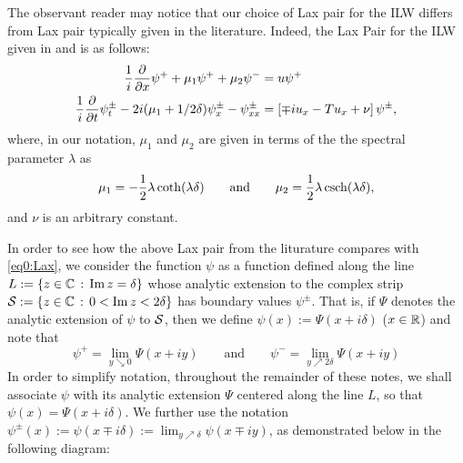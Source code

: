 \documentclass[../dissertation.tex]{subfiles}
\begin{document}
The observant reader may notice that our choice of Lax pair for the ILW differs 
from Lax pair typically given in the literature. Indeed, the Lax Pair for the ILW
given in \cite{SATSUMA1979} and \cite{Kodama1982} is as follows:
\begin{subequations}
	\label{eq:ILW.lax}
	\begin{align}
		\label{eq:ILW.lax.x} 
		\frac{1}{i} \frac{\partial}{\partial x} \psi^+ + \mu_1\psi^+ + \mu_2\psi^- &= u \psi^+  \\
		\label{eq:ILW.lax.t}
		\frac{1}{i} \frac{\partial}{\partial t} \psi_t^\pm - 2i (\mu_1 + 1/2\delta) \psi_x^\pm - \psi_{xx}^\pm 
			&= \left[ \mp i u_x - T u_x + \nu \right]\psi^\pm,
	\end{align}
\end{subequations}
where, in our notation, $\mu_1$ and $\mu_2$ are given in terms of the 
the spectral parameter $\lambda$ as
\begin{align*} \label{LambdaAndMu}
	\mu_1 = - \frac{1}{2} \lambda \coth(\lambda \delta) \qquad \text{and} \qquad
	\mu_2 = \frac{1}{2}\lambda \operatorname{csch}(\lambda \delta),
\end{align*}
and $\nu$ is an arbitrary constant.

In order to see how the above Lax pair from the liturature compares with 
\eqref{eq0:Lax},
we consider the function $\psi$ 
as a function defined along the line $L:= \{z \in \mathbb{C} \,:\, \operatorname{Im} z = \delta\}$ 
whose analytic extension to the complex strip 
$\mathcal S := \{ z \in \mathbb{C} \,:\,  0 < \operatorname{Im} z < 2 \delta\}$
has boundary values $\psi^\pm$. That is, if $\Psi$ denotes the analytic
extension of $\psi$ to $\mathcal S$, then we define $\psi(x) := \Psi(x + i \delta)$
($x \in \mathbb{R}$) and note that 
\[
	\psi^+ = \lim_{y \searrow 0} \Psi(x + i y) 
		\qquad \text{and} \qquad
	\psi^- = \lim_{y \nearrow 2\delta} \Psi(x + i y)
\]
In order to simplify notation, throughout the remainder of these notes, 
we shall associate $\psi$ with its analytic extension $\Psi$ centered
along the line $L$, so that $\psi(x) = \Psi(x + i\delta)$. 
We further use the notation $\psi^{\pm}(x) := \psi(x \mp i \delta) := 
\lim_{y \nearrow \delta} \psi(x \mp i y)$, as demonstrated below in the
following diagram:
\end{document}
